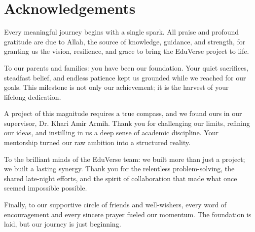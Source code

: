 \chapter*{Acknowledgements}

Every meaningful journey begins with a single spark. All praise and profound
gratitude are due to Allah, the source of knowledge, guidance, and strength,
for granting us the vision, resilience, and grace to bring the EduVerse
project to life.

To our parents and families: you have been our foundation. Your quiet
sacrifices, steadfast belief, and endless patience kept us grounded while we
reached for our goals. This milestone is not only our achievement; it is the
harvest of your lifelong dedication.

A project of this magnitude requires a true compass, and we found ours in our
supervisor, Dr. Khari Amir Armih. Thank you for challenging our limits,
refining our ideas, and instilling in us a deep sense of academic discipline.
Your mentorship turned our raw ambition into a structured reality.

To the brilliant minds of the EduVerse team: we built more than just a project;
we built a lasting synergy. Thank you for the relentless problem-solving, the
shared late-night efforts, and the spirit of collaboration that made what once
seemed impossible possible.

Finally, to our supportive circle of friends and well-wishers, every word of
encouragement and every sincere prayer fueled our momentum. The foundation is
laid, but our journey is just beginning.
